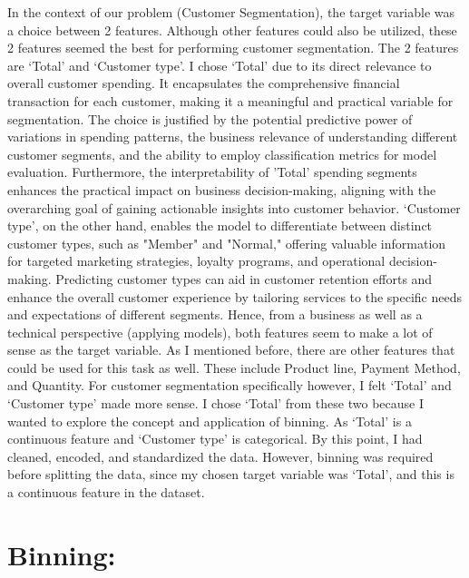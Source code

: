  In the context of our problem (Customer Segmentation), the target variable was a choice between 2 features. Although other features could also be utilized, these 2 features seemed the best for performing customer segmentation. The 2 features are ‘Total’ and ‘Customer type’. 
 \newline 
 I chose ‘Total’ due to its direct relevance to overall customer spending. It encapsulates the comprehensive financial transaction for each customer, making it a meaningful and practical variable for segmentation. The choice is justified by the potential predictive power of variations in spending patterns, the business relevance of understanding different customer segments, and the ability to employ classification metrics for model evaluation. Furthermore, the interpretability of 'Total' spending segments enhances the practical impact on business decision-making, aligning with the overarching goal of gaining actionable insights into customer behavior.
 \newline
 ‘Customer type’, on the other hand, enables the model to differentiate between distinct customer types, such as "Member" and "Normal," offering valuable information for targeted marketing strategies, loyalty programs, and operational decision-making. Predicting customer types can aid in customer retention efforts and enhance the overall customer experience by tailoring services to the specific needs and expectations of different segments. 
 \newline 
 Hence, from a business as well as a technical perspective (applying models), both features seem to make a lot of sense as the target variable. As I mentioned before, there are other features that could be used for this task as well. These include Product line, Payment Method, and Quantity. For customer segmentation specifically however, I felt ‘Total’ and ‘Customer type’ made more sense.
 \newline
 I chose ‘Total’ from these two because I wanted to explore the concept and application of binning. As ‘Total’ is a continuous feature and ‘Customer type’ is categorical.
\newline 
By this point, I had cleaned, encoded, and standardized the data. However, binning was required before splitting the data, since my chosen target variable was ‘Total’, and this is a continuous feature in the dataset.

\section{Binning:}

